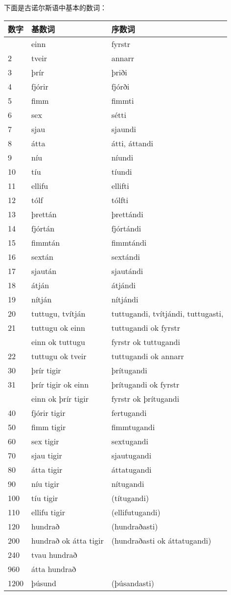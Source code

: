 下面是古诺尔斯语中基本的数词：

\begin{longtable}{lll}
\toprule
数字 & 基数词 & 序数词 \\
\midrule
\endhead
\bottomrule
\endfoot
1 & einn & fyrstr \\
2 & tveir & annarr \\
3 & þrír & þriði \\
4 & fjórir & fjórði \\
5 & fimm & fimmti \\
6 & sex & sétti \\
7 & sjau & sjaundi \\
8 & átta & átti, áttandi \\
9 & níu & níundi \\
10 & tíu & tíundi \\
11 & ellifu & ellifti \\
12 & tólf & tólfti \\
13 & þrettán & þrettándi \\
14 & fjórtán & fjórtándi \\
15 & fimmtán & fimmtándi \\
16 & sextán & sextándi \\
17 & sjaután & sjautándi \\
18 & átján & átjándi \\
19 & nítján & nítjándi \\
20 & tuttugu, tvítján & tuttugandi, tvítjándi, tuttugasti, \\
21 & tuttugu ok einn & tuttugandi ok fyrstr \\
& einn ok tuttugu & fyrstr ok tuttugandi \\
22 & tuttugu ok tveir & tuttugandi ok annarr \\
30 & þrír tigir & þrítugandi \\
31 & þrír tigir ok einn & þrítugandi ok fyrstr \\
& einn ok þrír tigir & fyrstr ok þrítugandi \\
40 & fjórir tigir & fertugandi \\
50 & fimm tigir & fimmtugandi \\
60 & sex tigir & sextugandi \\
70 & sjau tigir & sjautugandi \\
80 & átta tigir & áttatugandi \\
90 & níu tigir & nítugandi \\
100 & tíu tigir & (títugandi) \\
110 & ellifu tigir & (ellifutugandi) \\
120 & hundrað & (hundraðasti) \\
200 & hundrað ok átta tigir & (hundraðasti ok áttatugandi) \\
240 & tvau hundrað & \\
960 & átta hundrað & \\
1200 & þúsund & (þúsandasti) \\
\end{longtable}

